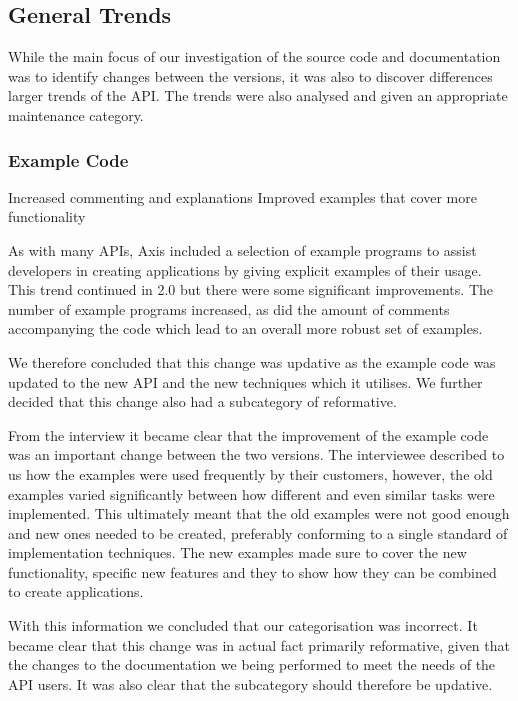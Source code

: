\documentclass{sig-alternate}
\begin{document}
\subsection{General Trends} 

While the main focus of our investigation of the source code and documentation was to identify changes between the versions, it was also to discover differences larger trends of the API. The trends were also analysed and given an appropriate maintenance category.

\subsubsection{Example Code}


Increased commenting and explanations
Improved examples that cover more functionality

As with many APIs, Axis included a selection of example programs to assist developers in creating applications by giving explicit examples of their usage. This trend continued in 2.0 but there were some significant improvements. The number of example programs increased, as did the amount of comments accompanying the code which lead to an overall more robust set of examples.

We therefore concluded that this change was updative as the example code was updated to the new API and the new techniques which it utilises. We further decided that this change also had a subcategory of reformative.

From the interview it became clear that the improvement of the example code was an important change between the two versions. The interviewee described to us how the examples were used frequently by their customers, however, the old examples varied significantly between how different and even similar tasks were implemented. This ultimately meant that the old examples were not good enough and new ones needed to be created, preferably conforming to a single standard of implementation techniques. The new examples made sure to cover the new functionality, specific new features and they to show how they can be combined to create applications.

With this information we concluded that our categorisation was incorrect. It became clear that this change was in actual fact primarily reformative, given that the changes to the documentation we being performed to meet the needs of the API users. It was also clear that the subcategory should therefore be updative. 
\end{document}
